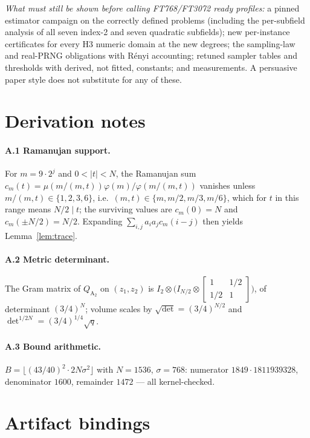 \documentclass[11pt,a4paper]{article}
\theoremstyle{remark}
\newcommand{\Atwo}{Q_{\mathrm{A}_2}}
\begin{document}
\emph{What must still be shown before calling FT768/FT3072 ready profiles:}
a pinned estimator campaign on the correctly defined problems (including the
per-subfield analysis of all seven index-2 and seven quadratic subfields);
new per-instance certificates for every H3 numeric domain at the new
degrees; the sampling-law and real-PRNG obligations with R\'enyi accounting;
retuned sampler tables and thresholds with derived, not fitted, constants;
and measurements. A persuasive paper style does not substitute for any of
these.

\appendix
\section{Derivation notes}
\label{app:deriv}

\paragraph{A.1 Ramanujan support.} For $m=9\cdot 2^{j}$ and $0<|t|<N$, the
Ramanujan sum $c_m(t)=\mu(m/(m,t))\varphi(m)/\varphi(m/(m,t))$ vanishes
unless $m/(m,t)\in\{1,2,3,6\}$, i.e.\ $(m,t)\in\{m,m/2,m/3,m/6\}$, which for
$t$ in this range means $N/2\mid t$; the surviving values are $c_m(0)=N$ and
$c_m(\pm N/2)=N/2$. Expanding $\sum_{i,j}a_ia_jc_m(i-j)$ then yields
Lemma~\ref{lem:trace}.

\paragraph{A.2 Metric determinant.} The Gram matrix of $\Atwo$ on $(z_1,z_2)$
is $I_2\otimes\bigl(I_{N/2}\otimes\left[\begin{smallmatrix}1&1/2\\1/2&1\end{smallmatrix}\right]\bigr)$,
of determinant $(3/4)^N$; volume scales by $\sqrt{\det}=(3/4)^{N/2}$ and
$\det^{1/2N}=(3/4)^{1/4}\sqrt q$.

\paragraph{A.3 Bound arithmetic.} $B=\lfloor(43/40)^2\cdot 2N\sigma^2\rfloor$
with $N=1536$, $\sigma=768$: numerator $1849\cdot1811939328$, denominator
$1600$, remainder $1472$ --- all kernel-checked.

\section{Artifact bindings}
\label{app:art}
\end{document}
